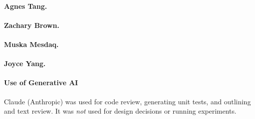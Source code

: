 \paragraph{Agnes Tang.}


\paragraph{Zachary Brown.}


\paragraph{Muska Mesdaq.}


\paragraph{Joyce Yang.}


\paragraph*{Use of Generative AI}

Claude (Anthropic) was used for code review, generating unit tests, and
outlining and text review. It was \emph{not} used for design decisions or running experiments.